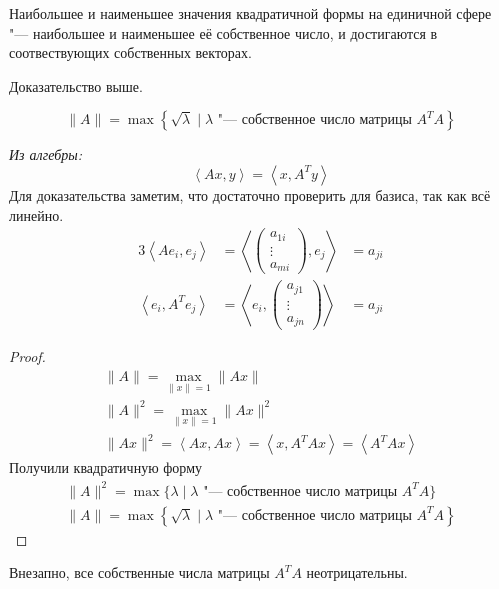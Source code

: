 \begin{theorem}
	Наибольшее и наименьшее значения квадратичной формы на единичной сфере "--- наибольшее и наименьшее её собственное число,
	и достигаются в соотвествующих собственных векторах.
\end{theorem}
Доказательство выше.
\begin{conseq}
	\[ \|A\| = \max \left\{\sqrt{\lambda} \mid \text{$\lambda$ "--- собственное число матрицы $A^TA$} \right\} \]
\end{conseq}
\begin{assertion}
	\textit{Из алгебры:}
	\[ \left<Ax, y\right> = \left<x, A^T y\right> \]
	Для доказательства заметим, что достаточно проверить для базиса, так как всё линейно.
	\begin{alignat*}{3}
		\left<Ae_i, e_j\right> &= \left< \begin{pmatrix} a_{1i} \\ \vdots \\ a_{mi} \end{pmatrix}, e_j \right> &= a_{ji} \\
		\left<e_i, A^Te_j\right> &= \left< e_i, \begin{pmatrix} a_{j1} \\ \vdots \\ a_{jn} \end{pmatrix} \right> &= a_{ji}
	\end{alignat*}
\end{assertion}

\begin{proof}
	\begin{gather*}
		\|A\| = \max_{\|x\| = 1} \|Ax\| \\
		\|A\|^2 = \max_{\|x\| = 1} \|Ax\|^2 \\
		\|Ax\|^2 = \left< Ax, Ax \right> = \left<x, A^TAx\right> = \left<A^TAx\right>
	\end{gather*}
	Получили квадратичную форму
	\begin{gather*}
		\|A\|^2 = \max \{\lambda \mid \text{$\lambda$ "--- собственное число матрицы $A^TA$}\} \\
		\|A\| = \max \left\{\sqrt{\lambda} \mid \text{$\lambda$ "--- собственное число матрицы $A^TA$} \right\}
	\end{gather*}
\end{proof}

\begin{Rem}
	Внезапно, все собственные числа матрицы $A^TA$ неотрицательны.
\end{Rem}


